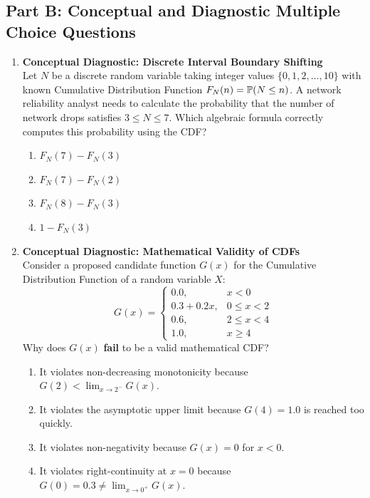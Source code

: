 \subsection*{Part B: Conceptual and Diagnostic Multiple Choice Questions}

\begin{enumerate}[resume]
\item \textbf{Conceptual Diagnostic: Discrete Interval Boundary Shifting} \\
Let $N$ be a discrete random variable taking integer values $\{0, 1, 2, \dots, 10\}$ with known Cumulative Distribution Function $F_N(n) = \P(N \le n)$. A network reliability analyst needs to calculate the probability that the number of network drops satisfies $3 \le N \le 7$. Which algebraic formula correctly computes this probability using the CDF?
\begin{enumerate}
    \item $F_N(7) - F_N(3)$
    \item $F_N(7) - F_N(2)$
    \item $F_N(8) - F_N(3)$
    \item $1 - F_N(3)$
\end{enumerate}

\item \textbf{Conceptual Diagnostic: Mathematical Validity of CDFs} \\
Consider a proposed candidate function $G(x)$ for the Cumulative Distribution Function of a random variable $X$:
$$G(x) = \begin{cases}
0.0, & x < 0 \\
0.3 + 0.2x, & 0 \le x < 2 \\
0.6, & 2 \le x < 4 \\
1.0, & x \ge 4
\end{cases}$$
Why does $G(x)$ \textbf{fail} to be a valid mathematical CDF?
\begin{enumerate}
    \item It violates non-decreasing monotonicity because $G(2) < \lim_{x \to 2^-} G(x)$.
    \item It violates the asymptotic upper limit because $G(4) = 1.0$ is reached too quickly.
    \item It violates non-negativity because $G(x) = 0$ for $x < 0$.
    \item It violates right-continuity at $x = 0$ because $G(0) = 0.3 \neq \lim_{x \to 0^+} G(x)$.
\end{enumerate}
\end{enumerate}
